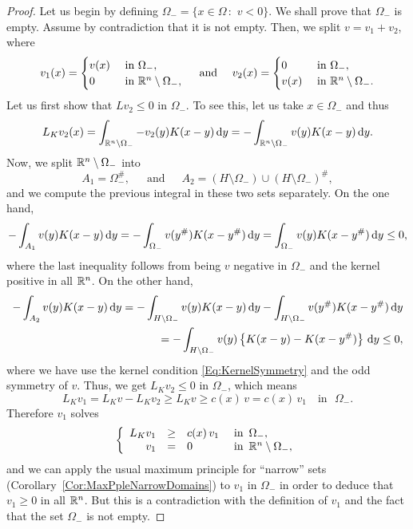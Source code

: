 \begin{proof}
	Let us begin by defining $\Omega_- = \{x\in \Omega \,:\,\, v<0\}$. We shall prove that $\Omega_-$ is empty. Assume by contradiction that it is not empty. Then, we split $ v = v_1+v_2$, where
	\begin{equation*}
	v_1(x) =
	\begin{cases}
	v(x)  &\textrm{ in } \Omega_-,\\
	0 &\textrm{ in } \mathbb{R}^n\setminus\Omega_-,
	\end{cases}
	\quad \text{ and } \quad
	v_2(x) =
	\begin{cases}
	0  &\textrm{ in } \Omega_-,\\
	v(x) &\textrm{ in } \mathbb{R}^n\setminus\Omega_-.
	\end{cases}
	\end{equation*}
	Let us first show that $Lv_2\leq 0$ in $\Omega_-$. To see this, let us take $x\in\Omega_-$ and thus
	$$
	L_K v_2(x) = \int_{\mathbb{R}^n\setminus\Omega_-} -v_2(y)K(x-y) \,\mathrm{d} y = -\int_{\mathbb{R}^n\setminus\Omega_-} v(y)K(x-y) \,\mathrm{d} y.
	$$
	Now, we split $\mathbb{R}^n\setminus\Omega_-$ into
	$$
	A_1 = \Omega_-^\#,\,\,\,\,\,\,\,\text{ and }\,\,\,\,\,\,\, A_2 = \left(H\setminus\Omega_-\right)\cup\left(H\setminus\Omega_-\right)^\#,
	$$
	and we compute the previous integral in these two sets separately. On the one hand,
	\begin{align*}
	-\int_{A_1} v(y)K(x-y) \,\mathrm{d} y = -\int_{\Omega_-} v(y^\#)K(x-y^\#) \,\mathrm{d} y  = \int_{\Omega_-} v(y)K(x-y^\#) \,\mathrm{d} y \leq 0,
	\end{align*}
	where the last inequality follows from being $v$ negative in $\Omega_-$ and the kernel positive in all $\mathbb{R}^n$.
	On the other hand,
	\begin{align*}
	-\int_{A_2} v(y)K(x-y) \,\mathrm{d} y = -\int_{H\setminus\Omega_-} v(y)K(x-y) \,\mathrm{d} y  -\int_{H\setminus\Omega_-} v(y^\#)K(x-y^\#) \,\mathrm{d} y \\
	= -\int_{H\setminus\Omega_-} v(y)\left\{K(x-y)-K(x-y^\#)\right\} \,\mathrm{d} y \leq 0,
	\end{align*}
	where we have use the kernel condition \eqref{Eq:KernelSymmetry} and the odd symmetry of $v$. Thus, we get $L_K v_2 \leq 0$ in $\Omega_-$, which means
	$$ L_K v_1 = L_K v-L_K v_2 \geq L_K v \geq c(x)\,v = c(x)\,v_1 \,\,\,\,\text{ in }\,\,\Omega_-. $$
	Therefore $v_1$ solves
	\begin{equation*}
	\left\{\begin{array}{rcll}
	L_K v_1 &\geq& c(x)\,v_1   &\textrm{ in } \,\Omega_-,\\
	v_1 &=& 0 &\textrm{ in }\,\mathbb{R}^n\setminus\Omega_-,
	\end{array} \right.
	\end{equation*}
	and we can apply the usual maximum principle for ``narrow'' sets (Corollary~\ref{Cor:MaxPpleNarrowDomains}) to $v_1$ in $\Omega_-$ in order to deduce that $v_1\geq 0$ in all $\mathbb{R}^n$. But this is a contradiction with the definition of $v_1$ and the fact that the set $\Omega_-$ is not empty.
\end{proof}


